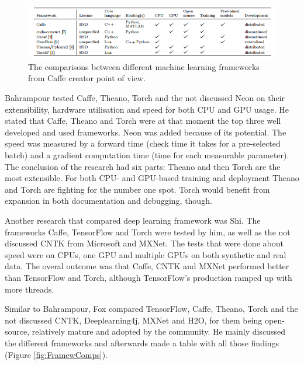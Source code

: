 \documentclass[10pt,a4paper]{report}
\begin{document}
	\begin{figure}[h!]
		\includegraphics{CaffeMachineLearningComparisons.PNG}
		\caption{The comparisons between different machine learning frameworks 
			from Caffe creator point of view. 
			\cite{DBLP:journals/corr/JiaSDKLGGD14}}
		\label{fig:CaffeMachLearnComp}
	\end{figure}
	
	Bahrampour tested Caffe, Theano, Torch and the not discussed Neon on their 
	extensibility, hardware utilisation and speed for both CPU and GPU usage. 
	He stated that Caffe, Theano and Torch were at that moment the top three 
	well developed and used frameworks. Neon was added because of its 
	potential. The speed was measured by a forward time (check time it takes 
	for a pre-selected batch) and a gradient computation time (time for each 
	measurable parameter). The conclusion of the research had six parts: Theano 
	and then Torch are the most extensible. For both CPU- and GPU-based 
	training and deployment Theano and Torch are fighting for the number one 
	spot. Torch would benefit from expansion in both documentation and 
	debugging, though. \cite{bahrampour2016comparative}
	
	Another research that compared deep learning framework was Shi. The 
	frameworks Caffe, TensorFlow and Torch were tested by him, as well as the 
	not discussed CNTK from Microsoft and MXNet. The tests that were done about 
	speed were on CPUs, one GPU and multiple GPUs on both synthetic and real 
	data. The overal outcome was that Caffe, CNTK and MXNet performed better 
	than TensorFlow and Torch, although TensorFlow's production ramped up with 
	more threads.
	\cite{DBLP:journals/corr/ShiWXC16}
	
	
	Similar to Bahrampour\cite{bahrampour2016comparative}, Fox compared 
	TensorFlow, Caffe, Theano, Torch and the not discussed CNTK, 
	Deeplearning4j, MXNet and H2O, for them being open-source, relatively 
	mature and adopted by the community. He mainly discussed the different 
	frameworks and afterwards made a table with all those findings (Figure 
	\ref{fig:FramewComps}). \cite{fox2016software}
	
\end{document}
